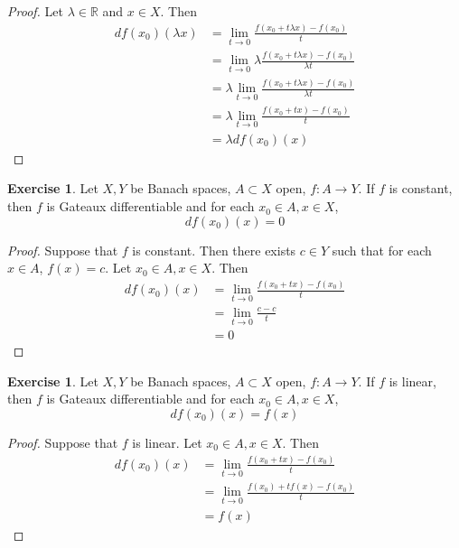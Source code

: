\documentclass[12pt]{amsart}
\theoremstyle{definition}
\newtheorem{ex}[definition]{Exercise}
\newcommand{\lam}{\lambda}
\newcommand{\R}{\mathbb{R}}
\DeclareMathOperator*{\0}{\mbf{0}}
\DeclareMathOperator*{\1}{\mbf{1}}
\newcommand{\lex}[1]{\label{ex:#1}}
\begin{document}
	\begin{proof}
	Let $\lam \in \R$ and $x \in X$. Then 
	\begin{align*}
	df(x_0)(\lam x) 
	&= \lim_{t \rightarrow 0} \frac{f(x_0 + t \lam x) - f(x_0)}{t} \\
	&= \lim_{t \rightarrow 0} \lam \frac{f(x_0 + t \lam x) - f(x_0)}{\lam t} \\
	&= \lam \lim_{t \rightarrow 0}  \frac{f(x_0 + t \lam x) - f(x_0)}{\lam t} \\
	&= \lam \lim_{t \rightarrow 0}  \frac{f(x_0 + t x) - f(x_0)}{t} \\
	&= \lam df(x_0)(x) 
	\end{align*}
	\end{proof}
	
	\begin{ex} \lex{61006}
	Let $X, Y$ be Banach spaces, $A \subset X$ open, $f:A \rightarrow Y$. If $f$ is constant, then $f$ is Gateaux differentiable and for each $x_0\in A, x \in X$, $$df(x_0)(x) = 0$$
	\end{ex}
	
	\begin{proof}
	Suppose that $f$ is constant. Then there exists $c \in Y$ such that for each $x \in A$, $f(x) = c$. Let $x_0 \in A, x \in X$. Then 
	\begin{align*}
	df(x_0)(x) 
	&= \lim_{t \rightarrow 0} \frac{f(x_0 + t x) - f(x_0)}{t} \\
	&= \lim_{t \rightarrow 0} \frac{c - c}{t} \\
	&= 0
	\end{align*}
	\end{proof}
	
	\begin{ex} \lex{61007}
	Let $X, Y$ be Banach spaces, $A \subset X$ open, $f:A \rightarrow Y$. If $f$ is linear, then $f$ is Gateaux differentiable and for each $x_0\in A, x \in X$, $$df(x_0)(x) = f(x)$$
	\end{ex}
	
	\begin{proof}
	Suppose that $f$ is linear. Let $x_0\in A, x \in X$. Then 
	\begin{align*}
	df(x_0)(x) 
	&= \lim_{t \rightarrow 0} \frac{f(x_0 + t x) - f(x_0)}{t} \\
	&= \lim_{t \rightarrow 0} \frac{f(x_0) + t f(x) - f(x_0)}{t} \\
	&= f(x)
	\end{align*}
	\end{proof}		
	
\end{document}
